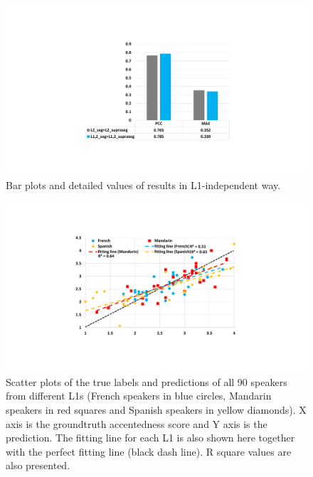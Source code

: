 \begin{figure}[t]
        \begin{minipage}[t]{1.0\linewidth}
        \centering
            \includegraphics[width=5.0in]{figures/allspk_results.pdf}
        \end{minipage}%
        \caption{Bar plots and detailed values of results in L1-independent way.}
        \centering
        \label{fig:allspk_results}
     \end{figure}

\begin{figure}[t]
        \begin{minipage}[t]{1.0\linewidth}
        \centering
            \includegraphics[width=5.0in]{figures/allspk_results_scatter.pdf}
        \end{minipage}%
        \caption{Scatter plots of the true labels and predictions of all 90 speakers from different L1s (French speakers in blue circles, Mandarin speakers in red squares and Spanish speakers in yellow diamonds). X axis is the groundtruth accentedness score and Y axis is the prediction. The fitting line for each L1 is also shown here together with the perfect fitting line (black dash line). R square values are also presented.}
        \centering
        \label{fig:allspk_results_scatter}
     \end{figure}

